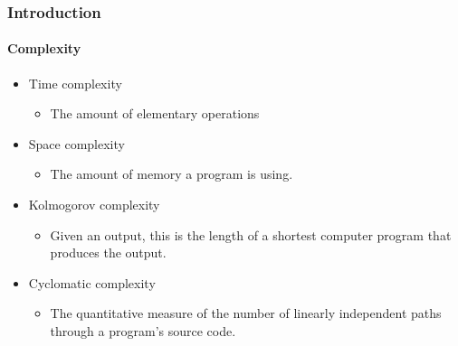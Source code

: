 \begin{frame}
    \frametitle{Introduction}
    \framesubtitle{Complexity}

    \begin{itemize}[<+->]
        \item Time complexity
        \begin{itemize}
            \item The amount of elementary operations
        \end{itemize}
        \item Space complexity
        \begin{itemize}
            \item The amount of memory a program is using.
        \end{itemize}
        \item Kolmogorov complexity
        \begin{itemize}
            \item Given an output, this is the length of a shortest computer
            program that produces the output.
        \end{itemize}
        \item Cyclomatic complexity
        \begin{itemize}
            \item The quantitative measure of the number of linearly
            independent paths through a program's source code.
        \end{itemize}
    \end{itemize}


\end{frame}
